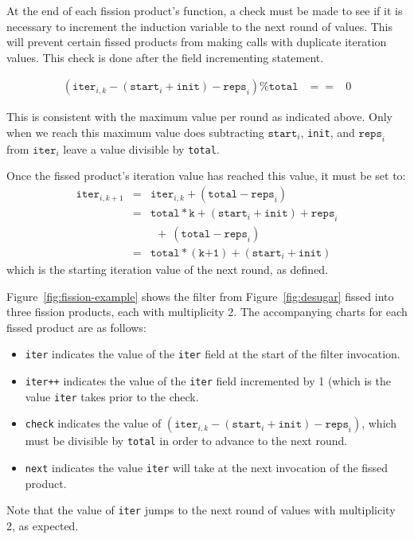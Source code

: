 At the end of each fission product's \work function, a check must be made to
see if it is necessary to increment the induction variable to the next
round of values.  This will prevent certain fissed products from
making calls with duplicate iteration values.  This check is done
after the field incrementing statement.

\begin{eqnarray*}
(\texttt{iter}_{i,k} - (\texttt{start}_i + \texttt{init}) - \texttt{reps}_i) \% \texttt{total} &==& 0
\end{eqnarray*}

This is consistent with the maximum value per round as
indicated above.  Only when we reach this maximum value does subtracting 
$\texttt{start}_i$, \texttt{init}, and $\texttt{reps}_i$ from $\texttt{iter}_i$ leave a value divisible by
\texttt{total}.

Once the fissed product's iteration value has reached
this value, it must be set to:
\begin{eqnarray*}
\texttt{iter}_{i,k+1} &=& \texttt{iter}_{i,k} + (\texttt{total} - \texttt{reps}_i) \\
&=& \texttt{total}*\texttt{k} + (\texttt{start}_i + \texttt{init}) + \texttt{reps}_i \\
&&  \ \ +\ (\texttt{total} - \texttt{reps}_i) \\
&=& \texttt{total}*(\texttt{k+1}) + (\texttt{start}_i + \texttt{init})
\end{eqnarray*}
which is the starting iteration value of the next round, as defined.

Figure~\ref{fig:fission-example} shows the filter from Figure~\ref{fig:desugar} fissed into three fission products, each with multiplicity 2.  The accompanying charts for each fissed product are as follows:
\begin{itemize}
\item{\tt iter} indicates the value of the {\tt iter} field at the start of the filter invocation.  
\item{\tt iter++} indicates the value of the {\tt iter} field incremented by 1 (which is the value {\tt iter} takes prior to the check.  
\item{\tt check} indicates the value of $(\texttt{iter}_{i,k} - (\texttt{start}_i + \texttt{init}) - \texttt{reps}_i)$, which must be divisible by {\tt total} in order to advance to the next round.  
\item{\tt next} indicates the value {\tt iter} will take at the next invocation of the fissed product.
\end{itemize}
Note that the value of \texttt{iter} jumps to the next round of values with multiplicity 2, as expected.

